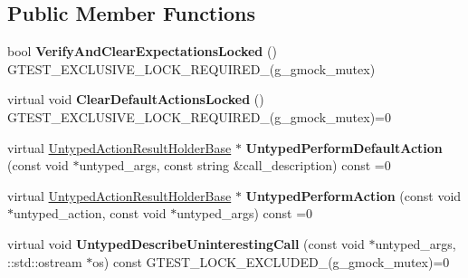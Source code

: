 \subsection*{Public Member Functions}
\begin{DoxyCompactItemize}
\item 
\mbox{\label{classtesting_1_1internal_1_1_untyped_function_mocker_base_a3f1d62a1662a3daa2895b3af963be269}} 
bool {\bfseries Verify\+And\+Clear\+Expectations\+Locked} () G\+T\+E\+S\+T\+\_\+\+E\+X\+C\+L\+U\+S\+I\+V\+E\+\_\+\+L\+O\+C\+K\+\_\+\+R\+E\+Q\+U\+I\+R\+E\+D\+\_\+(g\+\_\+gmock\+\_\+mutex)
\item 
\mbox{\label{classtesting_1_1internal_1_1_untyped_function_mocker_base_a40ddd95736946a7951033aa89a7b617f}} 
virtual void {\bfseries Clear\+Default\+Actions\+Locked} () G\+T\+E\+S\+T\+\_\+\+E\+X\+C\+L\+U\+S\+I\+V\+E\+\_\+\+L\+O\+C\+K\+\_\+\+R\+E\+Q\+U\+I\+R\+E\+D\+\_\+(g\+\_\+gmock\+\_\+mutex)=0
\item 
\mbox{\label{classtesting_1_1internal_1_1_untyped_function_mocker_base_a2cb149456cd559d5b0615f2310b235e3}} 
virtual \hyperlink{classtesting_1_1internal_1_1_untyped_action_result_holder_base}{Untyped\+Action\+Result\+Holder\+Base} $\ast$ {\bfseries Untyped\+Perform\+Default\+Action} (const void $\ast$untyped\+\_\+args, const string \&call\+\_\+description) const =0
\item 
\mbox{\label{classtesting_1_1internal_1_1_untyped_function_mocker_base_ada5a72303863d0aa655b66338b8efea5}} 
virtual \hyperlink{classtesting_1_1internal_1_1_untyped_action_result_holder_base}{Untyped\+Action\+Result\+Holder\+Base} $\ast$ {\bfseries Untyped\+Perform\+Action} (const void $\ast$untyped\+\_\+action, const void $\ast$untyped\+\_\+args) const =0
\item 
\mbox{\label{classtesting_1_1internal_1_1_untyped_function_mocker_base_a48a17fa75b744c2bfb19ee1f54d51759}} 
virtual void {\bfseries Untyped\+Describe\+Uninteresting\+Call} (const void $\ast$untyped\+\_\+args, \+::std\+::ostream $\ast$os) const G\+T\+E\+S\+T\+\_\+\+L\+O\+C\+K\+\_\+\+E\+X\+C\+L\+U\+D\+E\+D\+\_\+(g\+\_\+gmock\+\_\+mutex)=0

\end{DoxyCompactItemize}
